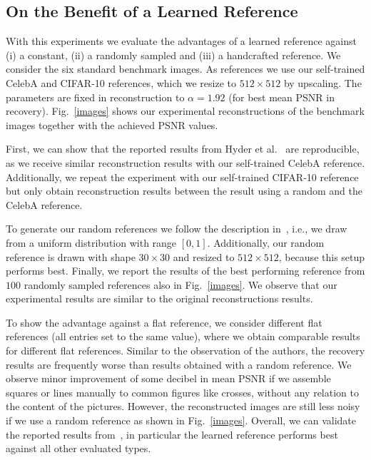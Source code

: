 \subsection{On the Benefit of a Learned Reference}

With this experiments we evaluate the advantages of a learned
reference against (i) a constant, (ii) a randomly sampled and (iii) a handcrafted reference. We consider the six standard benchmark images. As references we use our self-trained CelebA and CIFAR-10 references, which we resize to $512 \times 512$ by upscaling. The parameters are fixed in reconstruction to $\alpha = 1.92$ (for best mean PSNR in recovery). Fig.~\ref{images} shows our experimental reconstructions of the benchmark images together with the achieved PSNR values.

First, we can show that the reported results from Hyder et al.~\cite{hyder2020solving} are reproducible, as we receive similar reconstruction results with our self-trained CelebA reference. Additionally, we repeat the experiment with our self-trained CIFAR-10 reference but only obtain reconstruction results between the result using a random and the CelebA reference.

To generate our random references we follow the description in~\cite{hyder2020solving}, i.e., we draw from a uniform distribution with range $[0,1]$. Additionally, our random reference is drawn with shape $30 \times 30$ and resized to  $512 \times 512$, because this setup performs best. Finally, we report the results of the best performing reference from $100$ randomly sampled references also in Fig.~\ref{images}. We observe that our experimental results are similar to the original reconstructions results.

To show the advantage against a flat reference, we consider different flat references (all entries set to the same value), where we obtain comparable results for different flat references. Similar to the observation of the authors, the recovery results are frequently worse than results obtained with a random reference. We observe minor improvement of some decibel in mean PSNR if we assemble squares or lines manually to common figures like crosses, without any relation to the content of the pictures. However, the reconstructed images are still less noisy if we use a random reference as shown in Fig.~\ref{images}.
Overall, we can validate the reported results from~\cite{hyder2020solving}, in particular the learned reference performs best against all other evaluated types.

